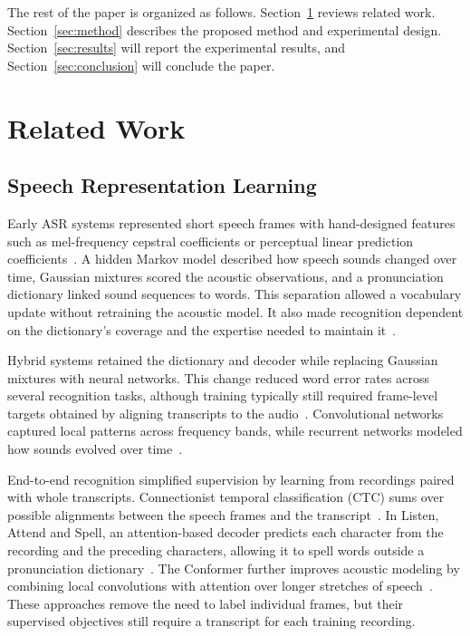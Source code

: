 \documentclass[conference]{IEEEtran}
\begin{document}
The rest of the paper is organized as follows. Section~\ref{sec:related} reviews related work. Section~\ref{sec:method} describes the proposed method and experimental design. Section~\ref{sec:results} will report the experimental results, and Section~\ref{sec:conclusion} will conclude the paper.

\section{Related Work}
\label{sec:related}

\subsection{Speech Representation Learning}
Early ASR systems represented short speech frames with hand-designed features such as mel-frequency cepstral coefficients or perceptual linear prediction coefficients~\cite{davis1980mfcc,hermansky1990plp}. A hidden Markov model described how speech sounds changed over time, Gaussian mixtures scored the acoustic observations, and a pronunciation dictionary linked sound sequences to words. This separation allowed a vocabulary update without retraining the acoustic model. It also made recognition dependent on the dictionary's coverage and the expertise needed to maintain it~\cite{gales2008hmm}.

Hybrid systems retained the dictionary and decoder while replacing Gaussian mixtures with neural networks. This change reduced word error rates across several recognition tasks, although training typically still required frame-level targets obtained by aligning transcripts to the audio~\cite{hinton2012dnn}. Convolutional networks captured local patterns across frequency bands, while recurrent networks modeled how sounds evolved over time~\cite{abdelhamid2014cnn,graves2013rnn}.

End-to-end recognition simplified supervision by learning from recordings paired with whole transcripts. Connectionist temporal classification (CTC) sums over possible alignments between the speech frames and the transcript~\cite{graves2006ctc}. In Listen, Attend and Spell, an attention-based decoder predicts each character from the recording and the preceding characters, allowing it to spell words outside a pronunciation dictionary~\cite{chan2016las}. The Conformer further improves acoustic modeling by combining local convolutions with attention over longer stretches of speech~\cite{gulati2020conformer}. These approaches remove the need to label individual frames, but their supervised objectives still require a transcript for each training recording.
\end{document}
